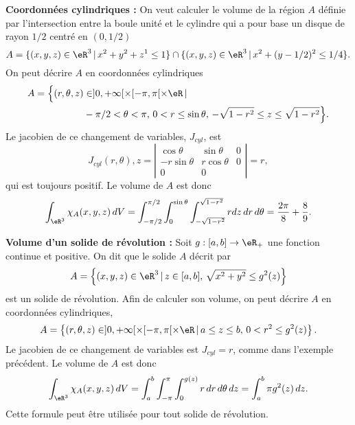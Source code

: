 \begin{example}
\textbf{Coordonnées cylindriques : }On veut calculer le volume de la région $A$ définie par  l'intersection entre la boule unité et le cylindre qui a pour base un disque de rayon $1/2$ centré en $(0, 1/2)$
\[
A=\{(x,y,z) \in\eR^3 \,\vert\, x^2+y^2+z^1\leq 1\}\cap\{(x,y,z) \in \eR^3\,\vert\, x^2+(y-1/2)^2\leq 1/4\}.
\]
On peut décrire $A$ en coordonnées cylindriques
\begin{equation}
  \begin{aligned}
    A=\Big\{(r,\theta,z) &\in ]0, +\infty[\times [-\pi,\pi[\times \eR\,\vert\,\\
& -\pi/2<\theta<\pi, \, 0<r\leq \sin\theta, \, -\sqrt{1-r^2}\leq z\leq\sqrt{1-r^2} \Big\}.
  \end{aligned}
\end{equation}
Le jacobien de ce changement de variables,  $J_{cyl}$, est
\begin{equation}
 J_{cyl}(r, \theta), z= \left\vert\begin{array}{ccc}
\cos \theta & \sin \theta & 0\\
-r\sin \theta  & r\cos \theta &0 \\
0&0&
\end{array}\right\vert= r,
\end{equation}
qui est toujours positif. Le volume de $A$ est donc
\[
\int_{\eR^3}\chi_{A}(x,y,z)\, dV=\int_{-\pi/2}^{\pi/2}\int_0^{\sin\theta}\int_{-\sqrt{1-r^2}}^{\sqrt{1-r^2}} r dz\,dr\,d\theta=\frac{2\pi}{8}+\frac{8}{9}.
\]
\end{example}

\begin{example}
\textbf{Volume d'un solide de révolution : }Soit $g:[a,b]\to\eR_+$ une fonction continue et positive. On dit que le solide $A$ décrit par
\[
A=\left\{(x,y,z)\in\eR^3\, \vert \, z\in[a,b], \,\sqrt{x^2+y^2}\leq g^2(z) \right\}
\]
est un solide de révolution. Afin de calculer son volume, on peut décrire $A$ en coordonnées cylindriques,
\[
A=\left\{(r,\theta,z) \in ]0, +\infty[\times [-\pi,\pi[\times \eR\,\vert\, a\leq z\leq b, \, 0<r^2\leq g^2(z) \right\}.
\]
Le jacobien de ce changement de variables est  $J_{cyl}=r$, comme dans l'exemple précédent. Le volume de $A$ est donc
\[
\int_{\eR^3}\chi_{A}(x,y,z)\, dV=\int_a^{b}\int_{-\pi}^{\pi}\int_{0}^{g(z)} r  \,dr\,d\theta\, dz=\int_a^{b} \pi g^2(z) \, dz.
\]
Cette formule peut être utilisée pour tout solide de révolution.
\end{example}

